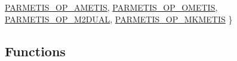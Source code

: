 \begin{DoxyCompactItemize}
\newline
\hyperlink{include_2parmetis_8h_a8f61c0f0e4ba81b0e3b6901026acb936ac5e6d041f21837175f76d698908cb625}{P\+A\+R\+M\+E\+T\+I\+S\+\_\+\+O\+P\+\_\+\+A\+M\+E\+T\+IS}, 
\hyperlink{include_2parmetis_8h_a8f61c0f0e4ba81b0e3b6901026acb936a351937a01dc7e48d92a5b3b218d7ef84}{P\+A\+R\+M\+E\+T\+I\+S\+\_\+\+O\+P\+\_\+\+O\+M\+E\+T\+IS}, 
\hyperlink{include_2parmetis_8h_a8f61c0f0e4ba81b0e3b6901026acb936af57320a84124459d84bb006f00982afe}{P\+A\+R\+M\+E\+T\+I\+S\+\_\+\+O\+P\+\_\+\+M2\+D\+U\+AL}, 
\hyperlink{include_2parmetis_8h_a8f61c0f0e4ba81b0e3b6901026acb936adf5e30191ffbb3823ca3a054496766e2}{P\+A\+R\+M\+E\+T\+I\+S\+\_\+\+O\+P\+\_\+\+M\+K\+M\+E\+T\+IS}
 \}
\end{DoxyCompactItemize}
\subsection*{Functions}
